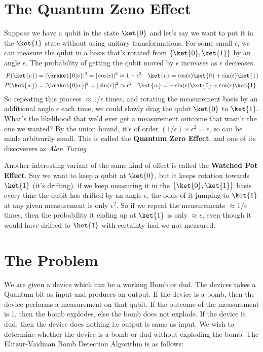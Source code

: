 \documentclass[12pt, oneside]{book}
\theoremstyle{definition}
\theoremstyle{definition}
\theoremstyle{remark}
\begin{document}
\section{The Quantum Zeno Effect}
Suppose we have a qubit in the state $\ket{0}$ and let's say we want to put it in the $\ket{1}$ state without using unitary transformations. For some small $\epsilon$, we can measure the qubit in a basis that's rotated from $\{\ket{0},\ket{1}\}$ by an angle $\epsilon$. The probability of getting the qubit moved by $\epsilon$ increases as $\epsilon$ decreases.
\begin{align*}
P(\ket{v})&=|\braket{0|v}|^2=|\cos (\epsilon)|^2 \approx 1-\epsilon^2 \quad \ket{v}=\cos (\epsilon) \ket{0}+\sin(\epsilon)\ket{1}\\
P(\ket{w})&=|\braket{0|w}|^2 = |\sin(\epsilon)|^2 \approx \epsilon^2 \quad \ket{w}=-\sin(\epsilon) \ket{0}+\cos(\epsilon)\ket{1}
\end{align*}
So repeating this process $\approx 1/\epsilon$ times, and rotating the measurement basis by an additional angle $\epsilon$ each time, we could slowly drag the qubit $\ket{0}$ to $\ket{1}$. What's the likelihood that we'd ever get a measurement outcome that wasn't the one we wanted? By the union bound, it's of order $(1/\epsilon) \times \epsilon^2=\epsilon$, so can be made arbitrarily small. This is called the \textbf{Quantum Zero Effect}, and one of its discoverers as \textit{Alan Turing}

Another interesting variant of the same kind of effect is called the \textbf{Watched Pot Effect}. Say we want to keep a qubit at $\ket{0}$, but it keeps rotation towards $\ket{1}$ (it's drifting). if we keep measuring it in the $\{\ket{0},\ket{1}\}$ basis every time the qubit has drifted by an angle $\epsilon$, the odds of it jumping to $\ket{1}$ at any given measurement is only $\epsilon^2$. So if we repeat the measurements $\approx 1/\epsilon$ times, then the probability it ending up at $\ket{1}$ is only $\approx \epsilon$, even though it would have drifted to $\ket{1}$ with certainty had we not measured.
\section{The Problem}
We are given a device which can be a working Bomb or dud. The devices takes a Quantum bit as input and produces an output.
If the device is a bomb, then the device performs a measurement on that qubit. If the outcome of the measurement is 1, then the bomb explodes, else the bomb does not explode.
If the device is dud, then the device does nothing i.e output is same as input.
We wish to determine whether the device is a bomb or dud without exploding the bomb. The Elitzur-Vaidman Bomb Detection Algorithm is as follows:
\end{document}
